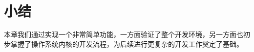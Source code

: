 \documentclass[main.tex]{subfiles}
\begin{document}
\begin{CJK*}{UTF8}{song}
\inputminted[linenos,numbersep=5pt,frame=lines,framesep=2mm]{make}{chapter02/kernel/Makefile}

\section{小结}
本章我们通过实现一个非常简单功能，一方面验证了整个开发环境，另一方面也初步掌握了操作系统内核的开发流程，为后续进行更复杂的开发工作奠定了基础。

\iffalse
    \section{调试}
    为了方便调试，经常需要输出一些格式化的数据，为此我们找了第三方的函数snprintf【】来实现格式化输出的功能。注意，该函数不支持浮点数的格式化输出。

    \inputminted[linenos,numbersep=5pt,frame=lines,framesep=2mm]{c}{chapter02/kernel/printk.c}
\fi

\clearpage
\end{CJK*}
\end{document}
